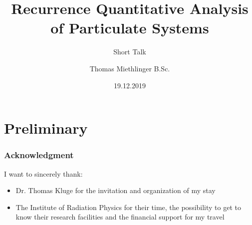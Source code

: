 \documentclass[9pt, english]{beamer}
\title{Recurrence Quantitative Analysis of Particulate Systems}
\subtitle{Short Talk}
\author{Thomas Miethlinger B.Sc.}
\date{19.12.2019}
\begin{document}

\jkulogowhite

%
%

\maketitle

\section{Preliminary}

%
%

\begin{frame}
\frametitle{Acknowledgment}
I want to sincerely thank:
\begin{itemize}
 \item Dr. Thomas Kluge for the invitation and organization of my stay
 \item The Institute of Radiation Physics for their time, the possibility to get to know their research facilities and the financial support for my travel
\end{itemize}
\end{frame}

%
%
\end{document}
